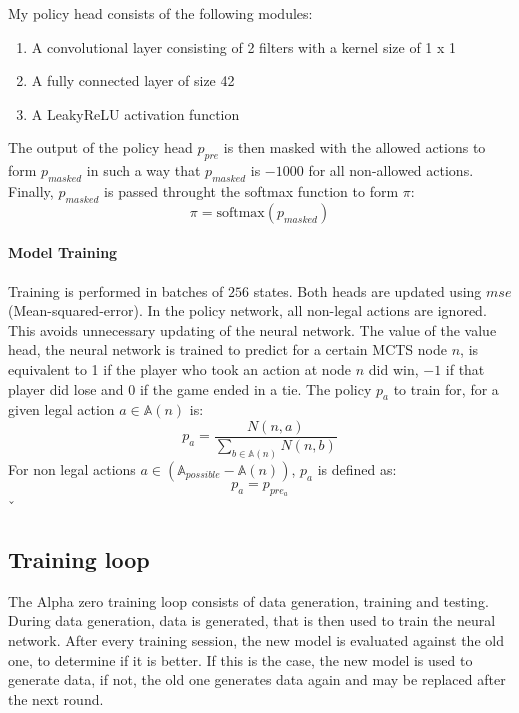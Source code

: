 \documentclass[12pt]{article}
\newcommand{\batchSize}{256}
\begin{document}
My policy head consists of the following modules:
\begin{enumerate}
\item A convolutional layer consisting of 2 filters with a kernel size of 1 x 1
\item A fully connected layer of size 42
\item A LeakyReLU activation function
\end{enumerate}
The output of the policy head \(p_{pre}\) is then masked with the allowed actions to form \(p_{masked}\) in such a way that \(p_{masked}\) is \(-1000\) for all non-allowed actions. Finally, \(p_{masked}\) is passed throught the softmax function to form \(\pi\):
\begin{equation}\label{eq:nn:policyDefinition}
\pi = \text{softmax}(p_{masked})
\end{equation}

\paragraph{Model Training}\label{sec:Methods:NN:A0:Training}
Training is performed in batches of \(\batchSize\) states. Both heads are updated using \(mse\) (Mean-squared-error). In the policy network, all non-legal actions are ignored. This avoids unnecessary updating of the neural network. The value of the value head, the neural network is trained to predict for a certain MCTS node \(n\), is equivalent to 1 if the player who took an action at node \(n\) did win, \(-1\) if that player did lose and \(0\) if the game ended in a tie. The policy \(p_{a}\) to train for, for a given legal action \(a\in \mathbb A(n)\) is:
\begin{equation} \label{eq:NN:policy_computation}
p_{a} = \frac{N(n, a)}{\sum_{b\in \mathbb A(n)} N(n, b)}
\end{equation}
For non legal actions \(a \in (\mathbb A_{possible} - \mathbb A(n))\), \(p_{a}\) is defined as:
\begin{equation} \label{eq:NN:policy_computation_nonlegal}
p_{a} = p_{pre_{a}}
\end{equation}ˇ

\subsection{Training loop}
The Alpha zero training loop consists of data generation, training and testing. During data generation, data is generated, that is then used to train the neural network. After every training session, the new model is evaluated against the old one, to determine if it is better. If this is the case, the new model is used to generate data, if not, the old one generates data again and may be replaced after the next round.
\end{document}
